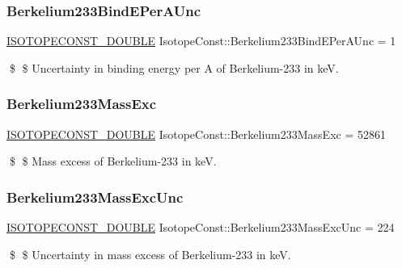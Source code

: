 \subsubsection{\texorpdfstring{Berkelium233\+Bind\+E\+Per\+A\+Unc}{Berkelium233BindEPerAUnc}}
{\footnotesize\ttfamily \mbox{\hyperlink{group___isotope_const-_macros_ga8f45a7272ce02c0b4c65c44636ed719a}{I\+S\+O\+T\+O\+P\+E\+C\+O\+N\+S\+T\+\_\+\+D\+O\+U\+B\+LE}} Isotope\+Const\+::\+Berkelium233\+Bind\+E\+Per\+A\+Unc = 1}

\$ \$ Uncertainty in binding energy per A of Berkelium-\/233 in keV. \mbox{\label{group___isotope_const-_berkelium-_bk233_ga491a28ec42df531fcf50d125080f7f87}} 
\subsubsection{\texorpdfstring{Berkelium233\+Mass\+Exc}{Berkelium233MassExc}}
{\footnotesize\ttfamily \mbox{\hyperlink{group___isotope_const-_macros_ga8f45a7272ce02c0b4c65c44636ed719a}{I\+S\+O\+T\+O\+P\+E\+C\+O\+N\+S\+T\+\_\+\+D\+O\+U\+B\+LE}} Isotope\+Const\+::\+Berkelium233\+Mass\+Exc = 52861}

\$ \$ Mass excess of Berkelium-\/233 in keV. \mbox{\label{group___isotope_const-_berkelium-_bk233_gaa490832022268d13700e9ae80a6b547f}} 
\subsubsection{\texorpdfstring{Berkelium233\+Mass\+Exc\+Unc}{Berkelium233MassExcUnc}}
{\footnotesize\ttfamily \mbox{\hyperlink{group___isotope_const-_macros_ga8f45a7272ce02c0b4c65c44636ed719a}{I\+S\+O\+T\+O\+P\+E\+C\+O\+N\+S\+T\+\_\+\+D\+O\+U\+B\+LE}} Isotope\+Const\+::\+Berkelium233\+Mass\+Exc\+Unc = 224}

\$ \$ Uncertainty in mass excess of Berkelium-\/233 in keV. \mbox{\label{group___isotope_const-_berkelium-_bk233_gaa40027bd7607b2b1672bcc52bf37046a}} 

